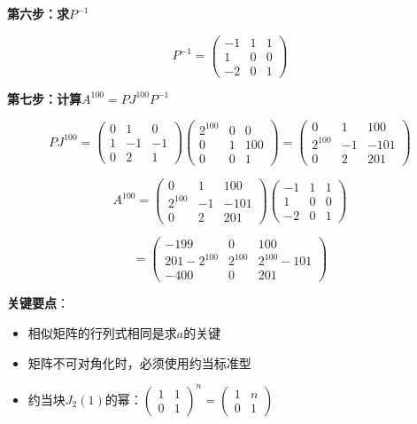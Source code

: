\documentclass[standard]{ExBook}
\begin{document}
\begin{qitems}
\begin{bbox}
\begin{solution}
            \textbf{第六步：求$P^{-1}$}
            
            $$P^{-1} = \begin{pmatrix} -1 & 1 & 1 \\ 1 & 0 & 0 \\ -2 & 0 & 1 \end{pmatrix}$$
            
            \textbf{第七步：计算$A^{100} = PJ^{100}P^{-1}$}
            
            $$PJ^{100} = \begin{pmatrix} 0 & 1 & 0 \\ 1 & -1 & -1 \\ 0 & 2 & 1 \end{pmatrix}\begin{pmatrix} 2^{100} & 0 & 0 \\ 0 & 1 & 100 \\ 0 & 0 & 1 \end{pmatrix} = \begin{pmatrix} 0 & 1 & 100 \\ 2^{100} & -1 & -101 \\ 0 & 2 & 201 \end{pmatrix}$$
            
            $$A^{100} = \begin{pmatrix} 0 & 1 & 100 \\ 2^{100} & -1 & -101 \\ 0 & 2 & 201 \end{pmatrix}\begin{pmatrix} -1 & 1 & 1 \\ 1 & 0 & 0 \\ -2 & 0 & 1 \end{pmatrix}$$
            
            $$= \boxed{\begin{pmatrix} -199 & 0 & 100 \\ 201-2^{100} & 2^{100} & 2^{100}-101 \\ -400 & 0 & 201 \end{pmatrix}}$$
            
            \textbf{关键要点}：
            \begin{itemize}
                \item 相似矩阵的行列式相同是求$a$的关键
                \item 矩阵不可对角化时，必须使用约当标准型
                \item 约当块$J_2(1)$的幂：$\begin{pmatrix} 1 & 1 \\ 0 & 1 \end{pmatrix}^n = \begin{pmatrix} 1 & n \\ 0 & 1 \end{pmatrix}$
            \end{itemize}
        \end{solution}
    \end{bbox}

\end{qitems}
\end{document}
